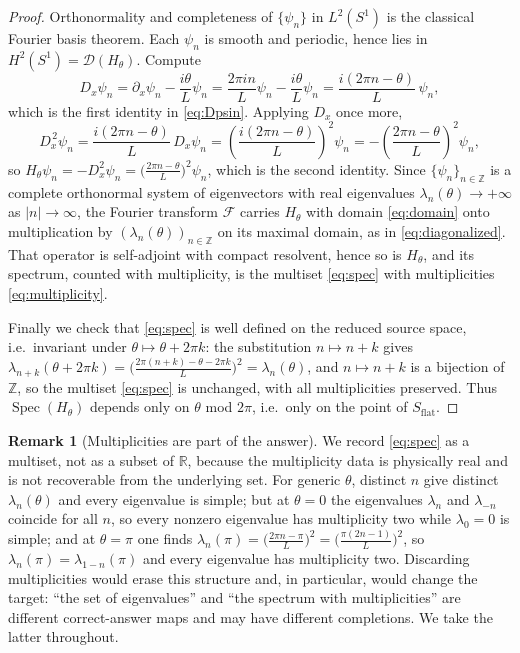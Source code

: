\documentclass[11pt,reqno]{amsart}
\theoremstyle{plain}
\theoremstyle{definition}
\newtheorem{remark}[theorem]{Remark}
\newcommand{\Rr}{\mathbb{R}}
\newcommand{\Zz}{\mathbb{Z}}
\newcommand{\Src}{S}
\newcommand{\Spec}{\operatorname{Spec}}
\newcommand{\Dx}{D_{x}}
\begin{document}
\begin{proof}
Orthonormality and completeness of $\{\psi_n\}$ in $L^2(S^1)$ is the classical Fourier basis
theorem. Each $\psi_n$ is smooth and periodic, hence lies in $H^2(S^1)=\mathcal D(H_\theta)$.
Compute
\begin{equation*}
\Dx\psi_n=\partial_x\psi_n-\frac{i\theta}{L}\psi_n
=\frac{2\pi i n}{L}\psi_n-\frac{i\theta}{L}\psi_n
=\frac{i(2\pi n-\theta)}{L}\,\psi_n,
\end{equation*}
which is the first identity in \eqref{eq:Dpsin}. Applying $\Dx$ once more,
\begin{equation*}
\Dx^{\,2}\psi_n=\frac{i(2\pi n-\theta)}{L}\,\Dx\psi_n
=\left(\frac{i(2\pi n-\theta)}{L}\right)^{\!2}\psi_n
=-\left(\frac{2\pi n-\theta}{L}\right)^{\!2}\psi_n,
\end{equation*}
so $H_\theta\psi_n=-\Dx^2\psi_n=\bigl(\tfrac{2\pi n-\theta}{L}\bigr)^2\psi_n$, which is the
second identity. Since $\{\psi_n\}_{n\in\Zz}$ is a complete orthonormal system of eigenvectors with real
eigenvalues $\lambda_n(\theta)\to+\infty$ as $|n|\to\infty$, the Fourier transform $\mathcal F$
carries $H_\theta$ with domain \eqref{eq:domain} onto multiplication by
$(\lambda_n(\theta))_{n\in\Zz}$ on its maximal domain, as in \eqref{eq:diagonalized}. That
operator is self-adjoint with compact resolvent, hence so is $H_\theta$, and its spectrum,
counted with multiplicity, is the multiset \eqref{eq:spec} with multiplicities
\eqref{eq:multiplicity}.

Finally we check that \eqref{eq:spec} is well defined on the reduced source space, i.e.\ invariant
under $\theta\mapsto\theta+2\pi k$: the substitution $n\mapsto n+k$ gives
$\lambda_{n+k}(\theta+2\pi k)=\bigl(\tfrac{2\pi(n+k)-\theta-2\pi k}{L}\bigr)^2=\lambda_n(\theta)$,
and $n\mapsto n+k$ is a bijection of $\Zz$, so the multiset \eqref{eq:spec} is unchanged, with all
multiplicities preserved. Thus $\Spec(H_\theta)$ depends only on $\theta$ mod $2\pi$, i.e.\ only
on the point of $\Src_{\mathrm{flat}}$.
\end{proof}

\begin{remark}[Multiplicities are part of the answer]\label{rem:multiplicities}
We record \eqref{eq:spec} as a multiset, not as a subset of $\Rr$, because the multiplicity data
is physically real and is not recoverable from the underlying set. For generic $\theta$, distinct
$n$ give distinct $\lambda_n(\theta)$ and every eigenvalue is simple; but at $\theta=0$ the
eigenvalues $\lambda_n$ and $\lambda_{-n}$ coincide for all $n$, so every nonzero eigenvalue has
multiplicity two while $\lambda_0=0$ is simple; and at $\theta=\pi$ one finds
$\lambda_n(\pi)=\bigl(\tfrac{2\pi n-\pi}{L}\bigr)^2=\bigl(\tfrac{\pi(2n-1)}{L}\bigr)^2$, so
$\lambda_n(\pi)=\lambda_{1-n}(\pi)$ and every eigenvalue has multiplicity two. Discarding
multiplicities would erase this structure and, in particular, would change the target: ``the set
of eigenvalues'' and ``the spectrum with multiplicities'' are different correct-answer maps and
may have different completions. We take the latter throughout.
\end{remark}
\end{document}
